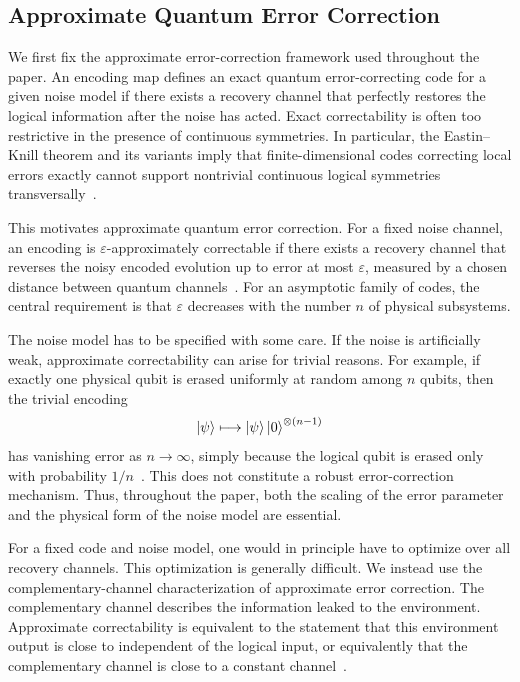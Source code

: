 \documentclass[10pt,twocolumn,superscriptaddress,aps,amsmath,amssymb,citeautoscript,floatfix,prx,longbibliography]{revtex4-2}
\theoremstyle{plain}
\theoremstyle{plain}
\theoremstyle{plain}
\theoremstyle{plain}
\theoremstyle{plain}
\theoremstyle{plain}
\begin{document}
\subsection{Approximate Quantum Error Correction}\label{subsec:main_AQEC}

We first fix the approximate error-correction framework used throughout the paper. An encoding map defines an exact quantum error-correcting code for a given noise model if there exists a recovery channel that perfectly restores the logical information after the noise has acted. Exact correctability is often too restrictive in the presence of continuous symmetries. In particular, the Eastin--Knill theorem and its variants imply that finite-dimensional codes correcting local errors exactly cannot support nontrivial continuous logical symmetries transversally~\cite{Eastin2009}.

This motivates approximate quantum error correction. For a fixed noise channel, an encoding is $\varepsilon$-approximately correctable if there exists a recovery channel that reverses the noisy encoded evolution up to error at most $\varepsilon$, measured by a chosen distance between quantum channels~\cite{Beny2010}. For an asymptotic family of codes, the central requirement is that $\varepsilon$ decreases with the number $n$ of physical subsystems.

The noise model has to be specified with some care. If the noise is artificially weak, approximate correctability can arise for trivial reasons. For example, if exactly one physical qubit is erased uniformly at random among $n$ qubits, then the trivial encoding
$$
\ket\psi
\longmapsto
\ket\psi\ket 0^{\otimes(n-1)}
$$
has vanishing error as $n\to\infty$, simply because the logical qubit is erased only with probability $1/n$~\cite{Yi2024}. This does not constitute a robust error-correction mechanism. Thus, throughout the paper, both the scaling of the error parameter and the physical form of the noise model are essential.

For a fixed code and noise model, one would in principle have to optimize over all recovery channels. This optimization is generally difficult. We instead use the complementary-channel characterization of approximate error correction. The complementary channel describes the information leaked to the environment. Approximate correctability is equivalent to the statement that this environment output is close to independent of the logical input, or equivalently that the complementary channel is close to a constant channel~\cite{Beny2010, Faist2020}.
\end{document}
